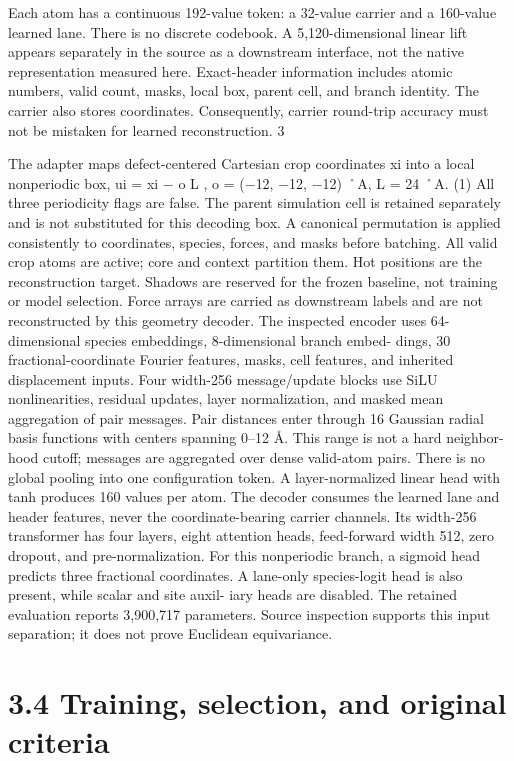 \documentclass[11pt]{article}
\begin{document}
Each atom has a continuous 192-value token: a 32-value carrier and a 160-value learned lane.
There is no discrete codebook. A 5,120-dimensional linear lift appears separately in the source as
a downstream interface, not the native representation measured here. Exact-header information
includes atomic numbers, valid count, masks, local box, parent cell, and branch identity. The
carrier also stores coordinates. Consequently, carrier round-trip accuracy must not be mistaken for
learned reconstruction.
3

The adapter maps defect-centered Cartesian crop coordinates xi into a local nonperiodic box,
ui = xi \ensuremath{-} o
L , o = (\ensuremath{-}12, \ensuremath{-}12, \ensuremath{-}12) ˚A, L = 24 ˚A. (1)
All three periodicity flags are false. The parent simulation cell is retained separately and is not
substituted for this decoding box. A canonical permutation is applied consistently to coordinates,
species, forces, and masks before batching. All valid crop atoms are active; core and context
partition them. Hot positions are the reconstruction target. Shadows are reserved for the frozen
baseline, not training or model selection. Force arrays are carried as downstream labels and are
not reconstructed by this geometry decoder.
The inspected encoder uses 64-dimensional species embeddings, 8-dimensional branch embed-
dings, 30 fractional-coordinate Fourier features, masks, cell features, and inherited displacement
inputs. Four width-256 message/update blocks use SiLU nonlinearities, residual updates, layer
normalization, and masked mean aggregation of pair messages. Pair distances enter through 16
Gaussian radial basis functions with centers spanning 0–12 Å. This range is not a hard neighbor-
hood cutoff; messages are aggregated over dense valid-atom pairs. There is no global pooling into
one configuration token. A layer-normalized linear head with tanh produces 160 values per atom.
The decoder consumes the learned lane and header features, never the coordinate-bearing carrier
channels. Its width-256 transformer has four layers, eight attention heads, feed-forward width 512,
zero dropout, and pre-normalization. For this nonperiodic branch, a sigmoid head predicts three
fractional coordinates. A lane-only species-logit head is also present, while scalar and site auxil-
iary heads are disabled. The retained evaluation reports 3,900,717 parameters. Source inspection
supports this input separation; it does not prove Euclidean equivariance.

\section*{3.4 Training, selection, and original criteria}
\end{document}
